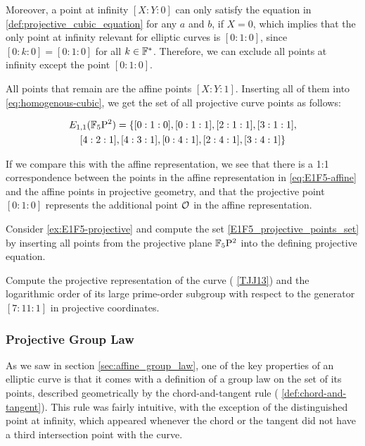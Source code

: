 \begin{example}
Moreover, a point at infinity $[X:Y:0]$ can only satisfy the equation in \eqref{def:projective_cubic_equation} for any $a$ and $b$, if $X=0$, which implies that the only point at infinity relevant for  elliptic curves is $[0:1:0]$, since $[0:k:0]= [0:1:0]$ for all $k\in\mathbb{F}^*$. Therefore, we can exclude all points at infinity except the point $[0:1:0]$.

All points that remain are the affine points $[X:Y:1]$. Inserting all of them into \eqref{eq:homogenous-cubic}, we get the set of all projective curve points as follows:

\begin{multline}
\label{E1F5_projective_points_set}
E_{1,1}(\mathbb{F}_5\mathrm{P}^2)=\{[0:1:0], [0:1:1], [2:1:1], [3:1:1], \\ [4:2:1], [4:3:1], [0:4:1], [2:4:1], [3:4:1]\}
\end{multline}

If we compare this with the affine representation, we see that there is a 1:1 correspondence between the points in the affine representation in \eqref{eq:E1F5-affine} and the affine points in projective geometry, and that the projective point $[0:1:0]$ represents the additional point $\mathcal{O}$ in the affine representation.
\end{example} 

\begin{exercise}
Consider \examplename{} \ref{ex:E1F5-projective} and compute the set \eqref{E1F5_projective_points_set} by inserting all points from the projective plane $\mathbb{F}_5\mathrm{P}^2$ into the defining projective  equation.
\end{exercise}

\begin{exercise}
Compute the projective representation of the  curve (\examplename{} \ref{TJJ13}) and the logarithmic order of its large prime-order subgroup with respect to the generator $[7:11:1]$ in projective coordinates.
\end{exercise}

\subsubsection{Projective Group Law}
\label{sec:projective_group_law}
As we saw in section \ref{sec:affine_group_law}, one of the key properties of an elliptic curve is that it comes with a definition of a group law on the set of its points, described geometrically by the chord-and-tangent rule ( \ref{def:chord-and-tangent}). This rule was fairly intuitive, with the exception of the distinguished point at infinity, which appeared whenever the chord or the tangent did not have a third intersection point with the curve.


